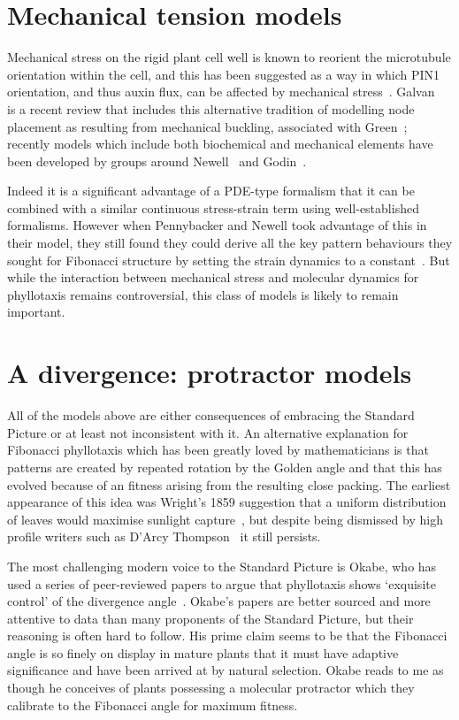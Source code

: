 \section{Mechanical tension models}
Mechanical stress on the rigid plant cell well is known to reorient the microtubule orientation within the cell, and this has been suggested as a way in which PIN1 orientation, and thus auxin flux, can be affected by mechanical stress~\autocite{heislerAlignmentPIN1Polarity2010}. Galvan~\autocite{galvan-ampudiaPhyllotaxisPatternsOrganogenesis2016} is a recent review that includes this alternative tradition of modelling node placement as resulting from mechanical buckling, associated with Green~\cite{greenPhyllotacticPatternsBiophysical1996};  recently models which include both biochemical and mechanical elements have been developed by groups around Newell~\cite{newellFibonacciPatternsCommon2013} and Godin~\cite{galvan-ampudiaTemporalIntegrationAuxin2020}.  

Indeed it is a significant advantage of a PDE-type formalism that it can be combined with a similar continuous stress-strain term using  well-established formalisms. However when Pennybacker and Newell took advantage of this in their model, they still found they could derive all the key pattern behaviours they sought for Fibonacci structure by setting the strain dynamics to a constant~\autocite{pennybackerPhyllotaxisProgressStory2015}. But while the interaction between mechanical stress and molecular dynamics for phyllotaxis remains controversial, this class of models is likely to remain important.


\section{A divergence: protractor models}
All of the models above are either consequences of embracing the Standard Picture or at least not inconsistent with it. 
An alternative  explanation for Fibonacci phyllotaxis which has been greatly loved by mathematicians is that patterns are created by
repeated rotation by the Golden angle and that this has evolved because of an fitness arising from the resulting close packing. The earliest appearance of this idea was Wright's 1859 suggestion that a uniform distribution of leaves would maximise sunlight capture~\autocite{wrightMostThoroughUniform1859}, but despite being dismissed by high profile writers such as D'Arcy Thompson~\cite{thompsonGrowthForm1917} it still persists.

The most challenging modern voice to the Standard Picture is Okabe, who has used a series of peer-reviewed papers to argue that phyllotaxis shows `exquisite control' of the divergence angle~\autocite{okabeRiddlePhyllotaxisExquisite2016}. Okabe's papers are better sourced and more attentive to data than many proponents of the Standard Picture, but their reasoning is often hard to follow. His prime claim seems to be that the Fibonacci angle is so finely on display in mature plants that it must have adaptive significance and have been arrived at by natural selection.  Okabe reads to me as though he conceives of plants possessing a molecular protractor which they calibrate to the Fibonacci angle for maximum fitness. 

